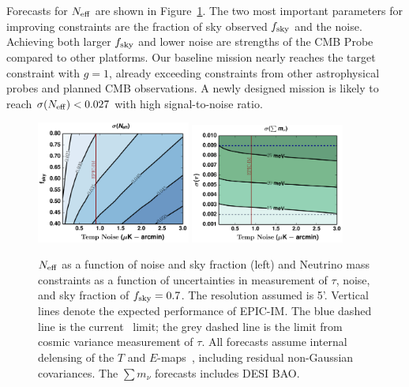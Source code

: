 Forecasts for ${N_{\rm eff}}$ are shown in Figure~\ref{fig:Neff_future}.  The two most important parameters for improving constraints
are the fraction of sky observed $f_{\rm sky}$ and the noise. Achieving both larger $f_{\rm sky}$ and
lower noise are strengths of the CMB Probe compared to other platforms. 
Our baseline mission nearly reaches the target constraint with $g=1$, already exceeding constraints 
from other astrophysical probes and planned CMB observations.
A newly designed mission is likely to reach $\sigma({N_{\rm eff}}) < 0.027$ with high signal-to-noise ratio. 

\begin{figure}[t!]
\begin{center}
\includegraphics[width=0.45\textwidth]{figs/Neff.pdf}
\includegraphics[width=0.45\textwidth]{figs/Mnu_tauprior.pdf}
\caption{ \small \setlength{\baselineskip}{0.95\baselineskip}
${N_{\rm eff}}$ as a function of noise and sky fraction (left) and
Neutrino mass constraints as a function of uncertainties in measurement of $\tau$, noise, and 
sky fraction of $f_{\rm sky} = 0.7$. The resolution assumed is 5'.  
Vertical lines denote the expected performance of EPIC-IM. 
The blue dashed line is the current \planck~limit; the grey dashed line is the limit from cosmic variance 
measurement of $\tau$. All forecasts assume internal delensing of the $T$ and $E$-maps~\cite{Green:2016cjr}, 
including residual non-Gaussian covariances.  The $\sum m_\nu$ forecasts includes DESI BAO.  
\label{fig:Neff_future} }
\end{center}
\vspace{-0.15in}
\end{figure}

